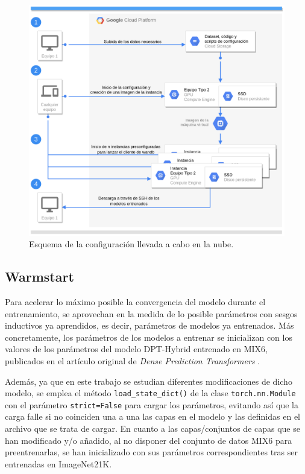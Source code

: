 \begin{figure}[H]
\centering
\includegraphics[width=\textwidth]{imagenes/cloud-diagram.png}
\caption{Esquema de la configuración llevada a cabo en la nube.}
\label{fig:cloud-diagram}
\end{figure}

\subsection{Warmstart}
Para acelerar lo máximo posible la convergencia del modelo durante el entrenamiento, se aprovechan en la medida de lo posible parámetros con sesgos inductivos ya aprendidos, es decir, parámetros de modelos ya entrenados. Más concretamente, los parámetros de los modelos a entrenar se inicializan con los valores de los parámetros del modelo DPT-Hybrid entrenado en MIX6, publicados en el artículo original de \textit{Dense Prediction Transformers} \cite{visiontransformersDPT}. 

Además, ya que en este trabajo se estudian diferentes modificaciones de dicho modelo, se emplea el método \texttt{load\_state\_dict()} de la clase \texttt{torch.nn.Module} con el parámetro \texttt{strict=False} para cargar los parámetros, evitando así que la carga falle si no coinciden una a una las capas en el modelo y las definidas en el archivo que se trata de cargar. En cuanto a las capas/conjuntos de capas que se han modificado y/o añadido, al no disponer del conjunto de datos MIX6 para preentrenarlas, se han inicializado con sus parámetros correspondientes tras ser entrenadas en ImageNet21K.

